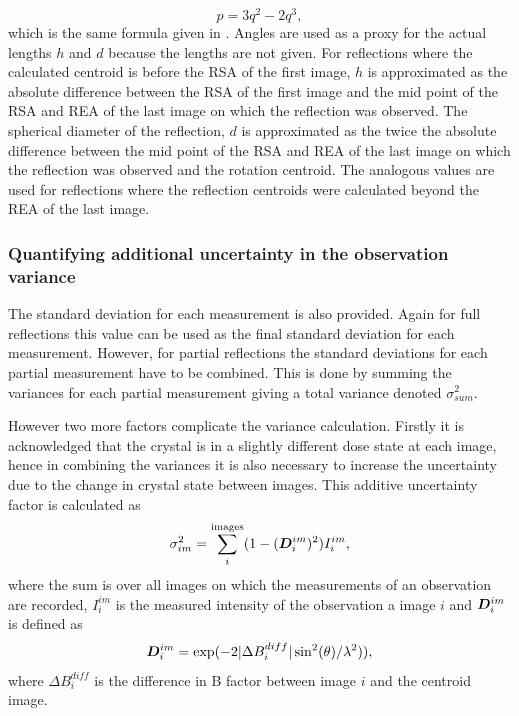 \begin{equation}
    p = 3q^2 - 2q^3,
    \label{eq:eq:Spherical cap volume ratio - Rossman}
\end{equation}
which is the same formula given in \cite{rossmann1979processing}.
Angles are used as a proxy for the actual lengths $h$ and $d$ because the lengths are not given.
For reflections where the calculated centroid is before the RSA of the first image, $h$ is approximated as the absolute difference between the RSA of the first image and the mid point of the RSA and REA of the last image on which the reflection was observed.
The spherical diameter of the reflection, $d$ is approximated as the twice the absolute difference between the mid point of the RSA and REA of the last image on which the reflection was observed and the rotation centroid.
The analogous values are used for reflections where the reflection centroids were calculated beyond the REA of the last image.

\subsubsection{Quantifying additional uncertainty in the observation variance}
\label{subs:Quantifying additional uncertainty in the observation variance}
The standard deviation for each measurement is also provided.
Again for full reflections this value can be used as the final standard deviation for each measurement.
However, for partial reflections the standard deviations for each partial measurement have to be combined.
This is done by summing the variances for each partial measurement giving a total variance denoted $\sigma^2_{sum}$.

However two more factors complicate the variance calculation.
Firstly it is acknowledged that the crystal is in a slightly different dose state at each image, hence in combining the variances it is also necessary to increase the uncertainty due to the change in crystal state between images.
This additive uncertainty factor is calculated as
\begin{equation}
    \sigma_{im}^2 = \sum_i^{\text{images}} (1 - (\boldsymbol{D}^{im}_i)^2) I^{im}_i,
\end{equation}
where the sum is over all images on which the measurements of an observation are recorded, $I^{im}_i$ is the measured intensity of the observation a image $i$ and $\boldsymbol{D}^{im}_i$ is defined as
\begin{equation}
    \boldsymbol{D}^{im}_i = \exp(-2 |\Delta B_{i}^{diff}|\sin^2(\theta) / \lambda^2)),
\end{equation}
where $\Delta B_{i}^{diff}$ is the difference in B factor between image $i$ and the centroid image.

